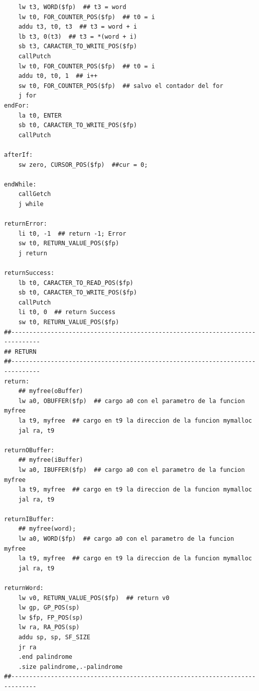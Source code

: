 \documentclass[a4paper,10pt]{article}
\begin{document}
\begin{lstlisting}
    lw t3, WORD($fp)  ## t3 = word
    lw t0, FOR_COUNTER_POS($fp)  ## t0 = i
    addu t3, t0, t3  ## t3 = word + i
    lb t3, 0(t3)  ## t3 = *(word + i)
    sb t3, CARACTER_TO_WRITE_POS($fp)
    callPutch
    lw t0, FOR_COUNTER_POS($fp)  ## t0 = i
    addu t0, t0, 1  ## i++
    sw t0, FOR_COUNTER_POS($fp)  ## salvo el contador del for
    j for
endFor:
    la t0, ENTER
    sb t0, CARACTER_TO_WRITE_POS($fp)
    callPutch

afterIf:
    sw zero, CURSOR_POS($fp)  ##cur = 0;

endWhile:
    callGetch
    j while

returnError:
    li t0, -1  ## return -1; Error
    sw t0, RETURN_VALUE_POS($fp)
    j return

returnSuccess:
    lb t0, CARACTER_TO_READ_POS($fp)
    sb t0, CARACTER_TO_WRITE_POS($fp)
    callPutch
    li t0, 0  ## return Success
    sw t0, RETURN_VALUE_POS($fp)
##------------------------------------------------------------------------------
## RETURN
##------------------------------------------------------------------------------
return:
    ## myfree(oBuffer)
    lw a0, OBUFFER($fp)  ## cargo a0 con el parametro de la funcion myfree
    la t9, myfree  ## cargo en t9 la direccion de la funcion mymalloc
    jal ra, t9

returnOBuffer:
    ## myfree(iBuffer)
    lw a0, IBUFFER($fp)  ## cargo a0 con el parametro de la funcion myfree
    la t9, myfree  ## cargo en t9 la direccion de la funcion mymalloc
    jal ra, t9

returnIBuffer:
    ## myfree(word);
    lw a0, WORD($fp)  ## cargo a0 con el parametro de la funcion myfree
    la t9, myfree  ## cargo en t9 la direccion de la funcion mymalloc
    jal ra, t9

returnWord:
    lw v0, RETURN_VALUE_POS($fp)  ## return v0
    lw gp, GP_POS(sp)
    lw $fp, FP_POS(sp)
    lw ra, RA_POS(sp)
    addu sp, sp, SF_SIZE
    jr ra
    .end palindrome
    .size palindrome,.-palindrome
##-----------------------------------------------------------------------------
            \end{lstlisting}
            
\end{document}
